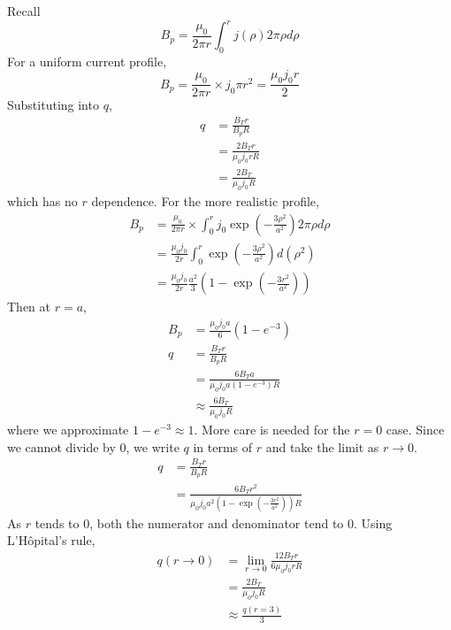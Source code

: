 \documentclass[answers]{exam}
\begin{document}
\begin{questions}
\begin{parts}
\begin{solution}
\begin{center}
    \end{center}
\end{solution}

\end{parts}


\begin{solution}
    Recall
    $$B_p = \frac{\mu_0}{2\pi r} \int_0^r j(\rho)2\pi\rho d\rho$$
    For a uniform current profile,
    $$B_p = \frac{\mu_0}{2\pi r} \times j_0 \pi r^2 = \frac{\mu_0j_0r}{2}$$
    Substituting into $q$,
    \begin{align*}
        q &= \frac{B_Tr}{B_pR} \\
          &= \frac{2B_Tr}{\mu_0j_0rR} \\
          &= \frac{2B_T}{\mu_0j_0R}
    \end{align*}
    which has no $r$ dependence. For the more realistic profile,
    \begin{align*}
        B_p &= \frac{\mu_0}{2\pi r} \times \int_0^r j_0\exp\left(-\frac{3\rho^2}{a^2}\right) 2\pi\rho d\rho \\
            &= \frac{\mu_0j_0}{2r} \int_0^r \exp\left(-\frac{3\rho^2}{a^2}\right) d\left(\rho^2\right) \\
            &= \frac{\mu_0j_0}{2r} \frac{a^2}{3}\left(1 - \exp\left(-\frac{3r^2}{a^2}\right)\right)
    \end{align*}
    Then at $r = a$,
    \begin{align*}
        B_p &= \frac{\mu_0j_0a}{6} (1 - e^{-3}) \\
        q &= \frac{B_Tr}{B_pR} \\
          &= \frac{6B_Ta}{\mu_0j_0a(1-e^{-3})R} \\
          &\approx \frac{6B_T}{\mu_0j_0R}
    \end{align*}
    where we approximate $1 - e^{-3} \approx 1$. More care is needed for the $r = 0$ case. Since we cannot divide by 0, we write $q$ in terms of $r$ and take the limit as $r \rightarrow 0$.
    \begin{align*}
        q &= \frac{B_Tr}{B_pR} \\
          &= \frac{6B_Tr^2}{\mu_0j_0a^2\left(1-\exp\left(-\frac{3r^2}{a^2}\right)\right)R}
    \end{align*}
    As $r$ tends to 0, both the numerator and denominator tend to 0. Using L'H\^opital's rule,
    \begin{align*}
        q(r\rightarrow0) &= \lim_{r\rightarrow0} \frac{12B_Tr}{6\mu_0j_0rR} \\
                         &= \frac{2B_T}{\mu_0j_0R} \\
                         &\approx \frac{q(r=3)}{3}
    \end{align*}
\end{solution}


\end{questions}
\end{document}

